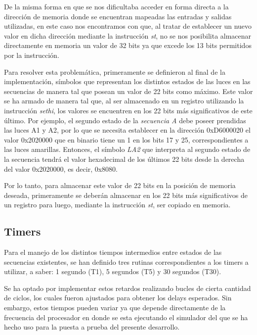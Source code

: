 \documentclass{article}
\begin{document}
	De la misma forma en que se nos dificultaba acceder en forma directa a la dirección de memoria donde se encuentran mapeadas las entradas y salidas utilizadas, en este caso nos encontramos con que, al tratar de establecer un nuevo valor en dicha dirección mediante la instrucción \textit{st}, no se nos posibilita almacenar directamente en memoria un valor de 32 bits ya que excede los 13 bits permitidos por la instrucción. 
	\par
	Para resolver esta problemática, primeramente se definieron al final de la implementación, símbolos que representan los distintos estados de las luces en las secuencias de manera tal que posean un valor de 22 bits como máximo. Este valor se ha armado de manera tal que, al ser almacenado en un registro utilizando la instrucción \textit{sethi}, los valores se encuentren en los 22 bits más significativos de este último. Por ejemplo, el segundo estado de la \textit{secuencia A} debe poseer prendidas las luces A1 y A2, por lo que se necesita establecer en la dirección 0xD6000020 el valor 0x2020000 que en binario tiene un 1 en los bits 17 y 25, correspondientes a las luces amarillas. Entonces, el símbolo \textit{LA2} que interpreta al segundo estado de la secuencia tendrá el valor hexadecimal de los últimos 22 bits desde la derecha del valor 0x2020000, es decir, 0x8080.
	\par
	Por lo tanto, para almacenar este valor de 22 bits en la posición de memoria deseada, primeramente se deberán almacenar en los 22 bits más significativos de un registro para luego, mediante la instrucción \textit{st}, ser copiado en memoria.
	\bigskip\medskip



\subsection{Timers}
\medskip
	
	Para el manejo de los distintos tiempos intermedios entre estados de las secuencias existentes, se han definido tres rutinas correspondientes a los timers a utilizar, a saber: 1 segundo (T1), 5 segundos (T5) y 30 segundos (T30).
	\par
	Se ha optado por implementar estos retardos realizando bucles de cierta cantidad de ciclos, los cuales fueron ajustados para obtener los delays esperados. Sin embargo, estos tiempos pueden variar ya que depende directamente de la frecuencia del procesador en donde se esta ejecutando el simulador del que se ha hecho uso para la puesta a prueba del presente desarrollo.
	\bigskip\bigskip
\end{document}
